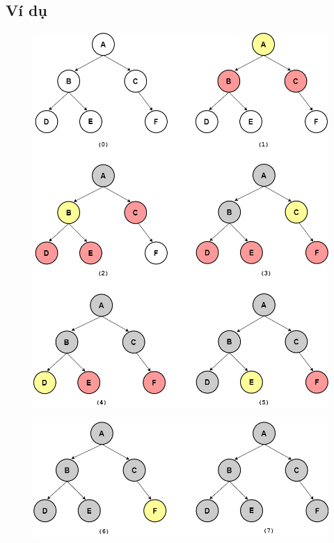 \subsection{Ví dụ}
\vspace{-0.5cm}
\begin{figure}[H]
    \centering
    \includegraphics[scale=0.45]{pic/BFS1.png}
    \label{fig:my_label}
\end{figure}
\begin{figure}[H]
    \centering
    \includegraphics[scale=0.45]{pic/BFS2.png}
    \label{fig:my_label}
\end{figure}
